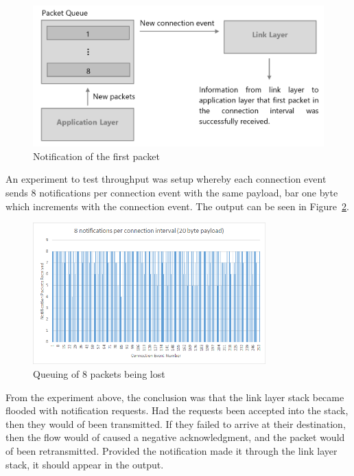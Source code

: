 \documentclass[]{article}
\begin{document}
\begin{figure}[H]
	\begin{center}
		\includegraphics[width = \textwidth]{nols}
	\end{center}
	\caption{Notification of the first packet}
	\label{fig:nols}
\end{figure}

An experiment to test throughput was setup whereby each connection event sends 8 notifications per connection event with the same payload, bar one byte which increments with the connection event. The output can be seen in Figure~\ref{fig:8pckt}.

\begin{figure}[H]
	\begin{center}
		\includegraphics[width = 0.8\textwidth]{8pckt}
	\end{center}
	\caption{Queuing of 8 packets being lost}
	\label{fig:8pckt}
\end{figure}

From the experiment above, the conclusion was that the link layer stack became flooded with notification requests. Had the requests been accepted into the stack, then they would of been transmitted. If they failed to arrive at their destination, then the flow would of caused a negative acknowledgment, and the packet would of been retransmitted. Provided the notification made it through the link layer stack, it should appear in the output. 
\end{document}
